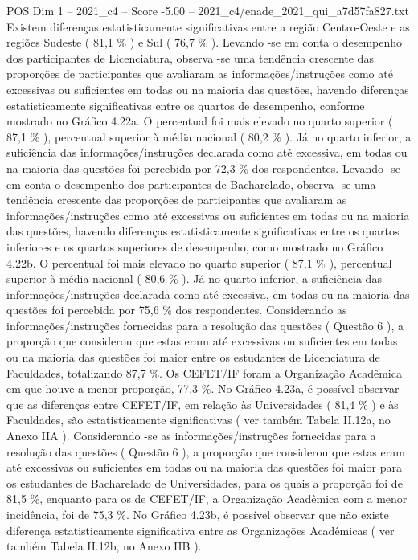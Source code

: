 \begin{textsample}{POS Dim 1 – 2021\_c4 – Score -5.00 – 2021\_c4/enade\_2021\_qui\_a7d57fa827.txt}
Existem diferenças estatisticamente significativas entre a região Centro-Oeste e as regiões Sudeste ( 81,1 \% ) e Sul ( 76,7 \% ).
Levando -se em conta o desempenho dos participantes de Licenciatura, observa -se uma tendência crescente das proporções de participantes que avaliaram as informações/instruções como até excessivas ou suficientes em todas ou na maioria das questões, havendo diferenças estatisticamente significativas entre os quartos de desempenho, conforme mostrado no Gráfico 4.22a.
O percentual foi mais elevado no quarto superior ( 87,1 \% ), percentual superior à média nacional ( 80,2 \% ).
Já no quarto inferior, a suficiência das informações/instruções declarada como até excessiva, em todas ou na maioria das questões foi percebida por 72,3 \% dos respondentes.
Levando -se em conta o desempenho dos participantes de Bacharelado, observa -se uma tendência crescente das proporções de participantes que avaliaram as informações/instruções como até excessivas ou suficientes em todas ou na maioria das questões, havendo diferenças estatisticamente significativas entre os quartos inferiores e os quartos superiores de desempenho, como mostrado no Gráfico 4.22b.
O percentual foi mais elevado no quarto superior ( 87,1 \% ), percentual superior à média nacional ( 80,6 \% ).
Já no quarto inferior, a suficiência das informações/instruções declarada como até excessiva, em todas ou na maioria das questões foi percebida por 75,6 \% dos respondentes.
Considerando as informações/instruções fornecidas para a resolução das questões ( Questão 6 ), a proporção que considerou que estas eram até excessivas ou suficientes em todas ou na maioria das questões foi maior entre os estudantes de Licenciatura de Faculdades, totalizando 87,7 \%.
Os CEFET/IF foram a Organização Acadêmica em que houve a menor proporção, 77,3 \%.
No Gráfico 4.23a, é possível observar que as diferenças entre CEFET/IF, em relação às Universidades ( 81,4 \% ) e às Faculdades, são estatisticamente significativas ( ver também Tabela II.12a, no Anexo IIA ).
Considerando -se as informações/instruções fornecidas para a resolução das questões ( Questão 6 ), a proporção que considerou que estas eram até excessivas ou suficientes em todas ou na maioria das questões foi maior para os estudantes de Bacharelado de Universidades, para os quais a proporção foi de 81,5 \%, enquanto para os de CEFET/IF, a Organização Acadêmica com a menor incidência, foi de 75,3 \%.
No Gráfico 4.23b, é possível observar que não existe diferença estatisticamente significativa entre as Organizações Acadêmicas ( ver também Tabela II.12b, no Anexo IIB ).

\end{textsample}
